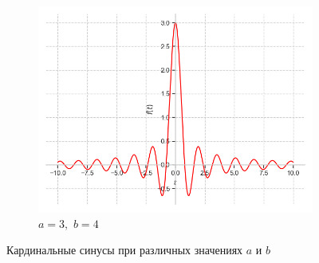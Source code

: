 \documentclass[a4paper, 16pt]{article}
\begin{document}
\begin{figure}[htbp]
\begin{subfigure}{0.3\textwidth}
            \label{fig:sinc_2}
        \end{subfigure}
        \hfill
        \begin{subfigure}{0.3\textwidth}
            \centering
            \includegraphics[width=\linewidth]{sinc_a=3_b=4.png}
            \caption{$a=3,\,\,b=4$}
            \label{fig:sinc_3}
        \end{subfigure}
        \caption{Кардинальные синусы при различных значениях $a$ и $b$}
        \label{fig:sincs}
    \end{figure}
\end{document}

